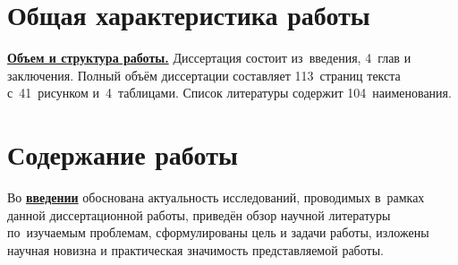 \section*{Общая характеристика работы}

\newcommand{\actuality}{\pdfbookmark[1]{Актуальность}{actuality}\underline{\textbf{\actualityTXT}}}
\newcommand{\progress}{\pdfbookmark[1]{Разработанность темы}{progress}\underline{\textbf{\progressTXT}}}
\newcommand{\aim}{\pdfbookmark[1]{Цели}{aim}\underline{{\textbf\aimTXT}}}
\newcommand{\tasks}{\pdfbookmark[1]{Задачи}{tasks}\underline{\textbf{\tasksTXT}}}
\newcommand{\aimtasks}{\pdfbookmark[1]{Цели и задачи}{aimtasks}\aimtasksTXT}
\newcommand{\novelty}{\pdfbookmark[1]{Научная новизна}{novelty}\underline{\textbf{\noveltyTXT}}}
\newcommand{\influence}{\pdfbookmark[1]{Практическая значимость}{influence}\underline{\textbf{\influenceTXT}}}
\newcommand{\methods}{\pdfbookmark[1]{Методология и методы исследования}{methods}\underline{\textbf{\methodsTXT}}}
\newcommand{\defpositions}{\pdfbookmark[1]{Положения, выносимые на защиту}{defpositions}\underline{\textbf{\defpositionsTXT}}}
\newcommand{\reliability}{\pdfbookmark[1]{Достоверность}{reliability}\underline{\textbf{\reliabilityTXT}}}
\newcommand{\probation}{\pdfbookmark[1]{Апробация}{probation}\underline{\textbf{\probationTXT}}}
\newcommand{\contribution}{\pdfbookmark[1]{Личный вклад}{contribution}\underline{\textbf{\contributionTXT}}}
\newcommand{\publications}{\pdfbookmark[1]{Публикации}{publications}\underline{\textbf{\publicationsTXT}}}



\underline{\textbf{Объем и структура работы.}} Диссертация состоит из~введения, 4~глав и заключения. Полный объём диссертации составляет
113~страниц текста с~41~рисунком и~4~таблицами. Список
литературы содержит 104~наименования.

\section*{Содержание работы}
Во \underline{\textbf{введении}} обоснована актуальность
исследований, проводимых в~рамках данной диссертационной работы,
приведён обзор научной литературы по~изучаемым проблемам,
сформулированы цель и задачи работы, изложены научная новизна
и практическая значимость представляемой работы.


